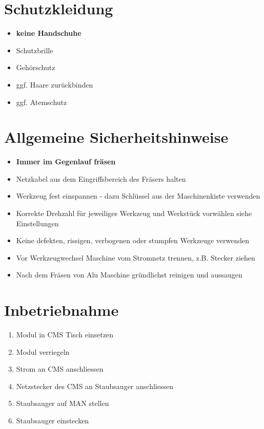 \documentclass[10pt]{scrartcl}
\date{\vspace{-5ex}}
\title{\flushleft{FESTOOL Tischfr\"ase TF 1400}}
\begin{document}
\maketitle
\thispagestyle{fancy}
\section{Schutzkleidung}
\begin{itemize}
\item \textbf{keine Handschuhe}
\item Schutzbrille
\item Gehörschutz
\item ggf. Haare zurückbinden 
\item ggf. Atemschutz 
\end{itemize}
\section{Allgemeine Sicherheitshinweise}
\begin{itemize}
\item \textbf{Immer im Gegenlauf fräsen}
\item Netzkabel aus dem Eingriffsbereich des Fräsers halten
\item Werkzeug fest einspannen - dazu Schlüssel aus der Maschinenkiste verwenden
\item Korrekte Drehzahl für jeweiliges Werkzeug und Werkstück vorwählen siehe Einstellungen 
\item Keine defekten, rissigen, verbogenen oder stumpfen Werkzeuge verwenden
\item Vor Werkzeugwechsel Maschine vom Stromnetz trennen, z.B. Stecker ziehen
\item Nach dem Fräsen von Alu Maschine gründlichst reinigen und aussaugen
\end{itemize}

\section{Inbetriebnahme}
\begin{enumerate}
\item Modul in CMS Tisch einsetzen
\item Modul verriegeln
\item Strom an CMS anschliessen
\item Netzstecker des CMS an Staubsauger anschliessen
\item Staubsauger auf MAN stellen
\item Staubsauger einstecken
\end{enumerate}
\end{document}
